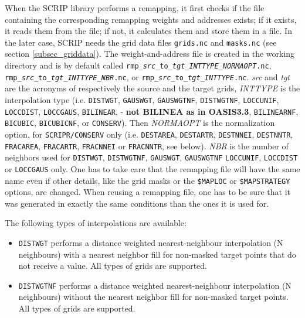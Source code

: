 \begin{itemize}
  When the SCRIP library performs a remapping, it first checks if the
  file containing the corresponding remapping weights and addresses
  exists; if it exists, it reads them from the file; if not, it
  calculates them and store them in a file. In the later case, SCRIP
  needs the grid data files {\tt grids.nc} and {\tt masks.nc} (see
  section \ref{subsec_griddata}).
  The weight-and-address file is created in the
  working directory and is by default called 
  {\tt rmp\_{\it src}\_to\_{\it tgt}\_{\it INTTYPE}\_{\it NORMAOPT}.nc}, 
  {\tt rmp\_{\it src}\_to\_{\it tgt}\_{\it INTTYPE}\_{\it NBR}.nc}, or 
  {\tt rmp\_{\it src}\_to\_{\it tgt}\_{\it INTTYPE}.nc}.  
  {\it src} and {\it tgt} are the acronyms of respectively the source and the target
  grids, {\it INTTYPE} is the interpolation type (i.e. {\tt DISTWGT},
  {\tt GAUSWGT}, {\tt GAUSWGTNF},  {\tt DISTWGTNF}, {\tt LOCCUNIF}, {\tt LOCCDIST}, {\tt LOCCGAUS}, {\tt BILINEAR}, - {\bf not BILINEA as in OASIS3.3}, 
  {\tt BILINEARNF}, {\tt BICUBIC}, {\tt BICUBICNF}, or
  {\tt CONSERV}).
  Then {\it NORMAOPT} is the normalization
  option, for {\tt SCRIPR/CONSERV} only (i.e. {\tt DESTAREA}, {\tt DESTARTR}, {\tt DESTNNEI}, {\tt DESTNNTR}, {\tt FRACAREA}, {\tt FRACARTR},  {\tt FRACNNEI} or {\tt FRACNNTR}, see below). {\it NBR} is the number of
  neighbors used for {\tt DISTWGT}, {\tt DISTWGTNF}, {\tt GAUSWGT},
  {\tt GAUSWGTNF}  {\tt LOCCUNIF}, {\tt LOCCDIST} or {\tt LOCCGAUS} only.
  One has to take care that the
  remapping file will have the same name even if other details, like
  the grid masks or the {\tt \$MAPLOC} or {\tt \$MAPSTRATEGY} options, 
  are changed. When reusing a remapping file, one has
  to be sure that it was generated in exactly the same conditions than
  the ones it is used for.

  The following types of interpolations are available:

  \begin{itemize}

  \item {\tt DISTWGT} performs a distance weighted nearest-neighbour
    interpolation (N neighbours) with a nearest neighbor fill for non-masked target points
    that do not receive a value. All types of grids are supported.

  \item {\tt DISTWGTNF} performs a distance weighted nearest-neighbour
    interpolation (N neighbours) without the nearest neighbor fill for non-masked target points. 
    All types of grids are supported.


\end{itemize}
\end{itemize}
